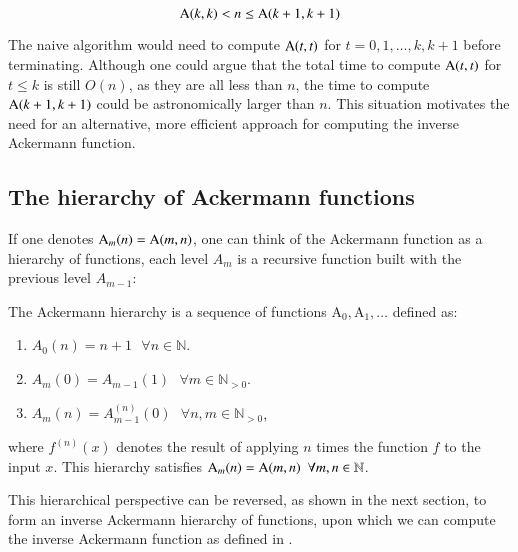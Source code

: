 \begin{equation}
\text{A}(k, k) < n \le \text{A}(k+1, k+1)
\end{equation}

The naive algorithm would need to compute 
$\text{A}(t, t)$ for $t = 0, 1, \ldots, k, k+1$ before terminating. 
{\color{magenta} Although one could argue that the total time to 
compute $\text{A}(t, t)$ for $t\le k$ is still $O(n)$, as they are all 
less than $n$, the time to compute $\text{A}(k+1, k+1)$ could be 
astronomically larger than $n$.} This situation motivates the 
need for an alternative, more efficient approach for computing 
the inverse Ackermann function.

\subsection{The hierarchy of Ackermann functions}

If one denotes {\color{magenta}$\text{A}_m(n) = \text{A}(m, n)$}, one can think 
of the Ackermann function as a hierarchy of functions, each 
level $A_m$ is a recursive function built with the previous 
level $A_{m-1}$:

\begin{defn} \label{defn: ack_hier}
	The Ackermann hierarchy is a sequence of functions 
	$\text{A}_0, \text{A}_1, \ldots $ defined as:
	\begin{enumerate}
		\item $A_0(n) = n + 1 \ \ \ \forall n\in \mathbb{N}$.
		\item $A_m(0) = A_{m-1}(1) \ \ \ \forall m\in \mathbb{N}_{>0}$.
		\item $A_{m}(n) = A_{m-1}^{(n)}(0) \ \ \ \forall n, m\in \mathbb{N}_{>0}$,
	\end{enumerate}
	\noindent where $f^{(n)}(x)$ {\color{magenta}denotes 
	the result of applying $n$ times the function $f$ to 
	the input $x$.} This hierarchy satisfies 
	$\text{A}_m(n) = \text{A}(m, n) \ \ \forall m, n\in \mathbb{N}$.
\end{defn}

This hierarchical perspective can be reversed, as shown in the 
next section, to form an inverse Ackermann hierarchy of functions, 
upon which we can compute the inverse Ackermann function as 
defined in .